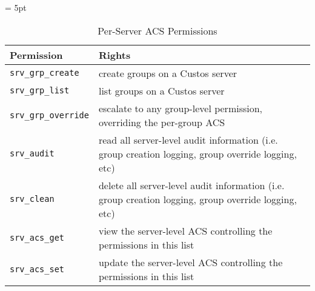 \begin{table}[!tbh]
  \vspace{1ex}
  \begin{center}
    \tabulinesep = 5pt
    \begin{tabu} to \textwidth
      { | X[1,l,m]
        | X[4,l,m]
        | }
      \hline
      \textbf{Permission}
      & \textbf{Rights}
      \\ \hline
      \texttt{srv\_grp\_create}
      & create groups on a Custos server
      \\ \hline
      \texttt{srv\_grp\_list}
      & list groups on a Custos server
      \\ \hline
      \texttt{srv\_grp\_override}
      & escalate to any group-level permission, overriding the per-group ACS
      \\ \hline
      \texttt{srv\_audit}
      & read all server-level audit information
      \newline
      (i.e. group creation logging, group override logging, etc)
      \\ \hline
      \texttt{srv\_clean}
      & delete all server-level audit information
      \newline
      (i.e. group creation logging, group override logging, etc)
      \\ \hline
      \texttt{srv\_acs\_get}
      & view the server-level ACS controlling the permissions in this list
      \\ \hline
      \texttt{srv\_acs\_set}
      & update the server-level ACS controlling the permissions in this list
      \\ \hline
    \end{tabu}
  \end{center}
  \caption{Per-Server ACS Permissions}
  \label{tab:permissions-server}
\end{table}

